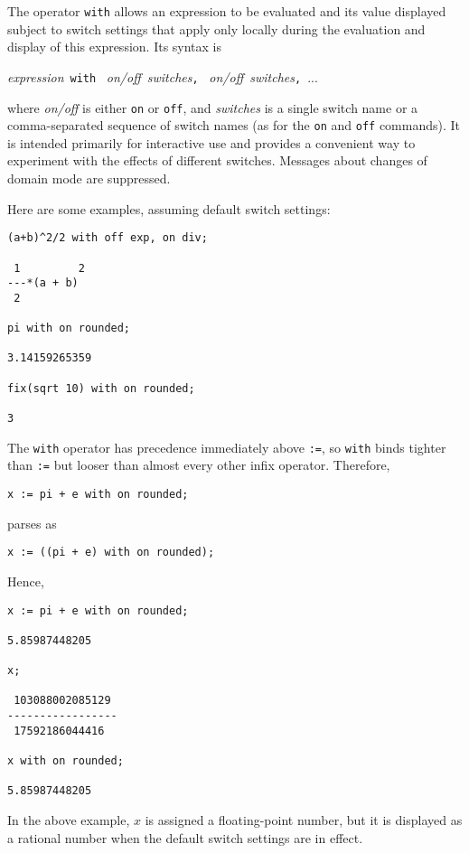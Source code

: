 
The operator \texttt{with} allows an expression to be evaluated and
its value displayed subject to switch settings that apply only locally
during the evaluation and display of this expression.  Its syntax is
\begin{center}
  \textit{expression}~\texttt{with}~%
  \textit{on/off}~\textit{switches}\texttt{,}~%
  \textit{on/off}~\textit{switches}\texttt{,}~...
\end{center}
where \textit{on/off} is either \texttt{on} or \texttt{off}, and
\textit{switches} is a single switch name or a comma-separated
sequence of switch names (as for the \texttt{on} and \texttt{off}
commands).  It is intended primarily for interactive use and provides
a convenient way to experiment with the effects of different switches.
Messages about changes of domain mode are suppressed.

Here are some examples, assuming default switch settings:
\begin{verbatim}
(a+b)^2/2 with off exp, on div;

 1         2
---*(a + b)
 2

pi with on rounded;

3.14159265359

fix(sqrt 10) with on rounded;

3
\end{verbatim}

The \texttt{with} operator has precedence immediately above
\texttt{:=}, so \texttt{with} binds tighter than \texttt{:=} but looser
than almost every other infix operator.  Therefore,
\begin{verbatim}
x := pi + e with on rounded;
\end{verbatim}
parses as
\begin{verbatim}
x := ((pi + e) with on rounded);
\end{verbatim}
Hence,
\begin{verbatim}
x := pi + e with on rounded;

5.85987448205

x;

 103088002085129
-----------------
 17592186044416

x with on rounded;

5.85987448205
\end{verbatim}
In the above example, $x$ is assigned a floating-point number, but it
is displayed as a rational number when the default switch settings are
in effect.

